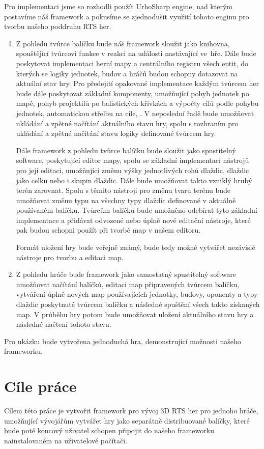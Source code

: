 Pro implementaci jsme so rozhodli použít UrhoSharp engine, nad kterým postavíme náš framework a pokusíme se zjednodušit využití tohoto enginu pro tvorbu našeho poddruhu RTS her. 
\begin{enumerate}
	\item Z pohledu tvůrce balíčku bude náš framework sloužit jako knihovna, spouštějící tvůrcovi funkce v reakci na události nastávající ve~hře. Dále bude poskytovat implementaci herní mapy a centrálního registru všech entit, do kterých se logiky jednotek, budov a hráčů budou schopny dotazovat na aktuální stav hry. Pro předejití opakované implementace každým tvůrcem her bude dále poskytovat základní komponenty, umožňující pohyb jednotek po mapě, pohyb projektilů po balistických křivkách a výpočty cílů podle pohybu jednotek, automatickou střelbu na cíle, . V neposlední řadě bude umožňovat ukládání a zpětné načítání aktuálního stavu hry, spolu s rozhraním pro ukládání a zpětné načítání stavu logiky definované tvůrcem hry. 
	
	Dále framework z pohledu tvůrce balíčku bude sloužit jako spustitelný software, poskytující editor mapy, spolu se základní implementací nástrojů pro její editaci, umožňující změnu výšky jednotlivých rohů dlaždic, dlaždic jako celku nebo i skupin dlaždic. Dále bude umožňovat takto vzniklý hrubý terén zarovnat. Spolu s těmito nástroji pro změnu tvaru terénu bude umožňovat změnu typu na všechny typy dlaždic definované v aktuálně používaném balíčku. Tvůrcům balíčků bude umožněno odebírat tyto základní implementace a přidávat odvozené nebo úplně nové editační nástroje, které pak budou schopni použít při tvorbě map v našem editoru.
	
	Formát uložení hry bude veřejně známý, bude tedy možné vytvářet nezávislé nástroje pro tvorbu a editaci map. 
	\item
	Z pohledu hráče bude framework jako samostatný spustitelný software umožňovat načítání balíčků, editaci map připravených tvůrcem balíčku, vytváření úplně nových map používajících jednotky, budovy, oponenty a typy dlaždic poskytnuté tvůrcem balíčku a následné spuštění všech takto získaných map. V průběhu hry potom bude umožňovat uložení aktuálního stavu hry a následné načtení tohoto stavu.
\end{enumerate}




Pro ukázku bude vytvořena jednoduchá hra, demonstrující možnosti našeho frameworku. 

\section{Cíle práce}
Cílem této práce je vytvořit framework pro vývoj 3D RTS her pro jednoho hráče, umožňující vývojářům vytvářet hry jako separátně 
distribuované balíčky, které bude poté koncový uživatel schopen připojit do našeho frameworku nainstalovaném na uživatelově počítači.

